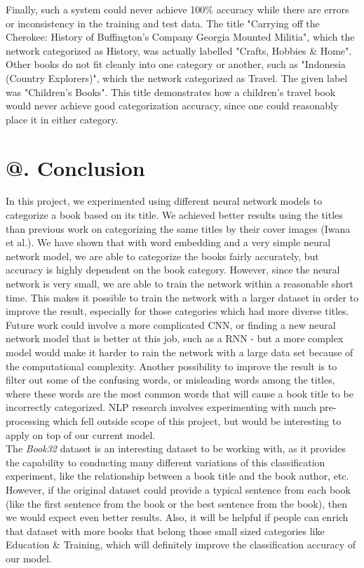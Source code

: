 \documentclass[jou,apacite, 10px]{apa6}
\makeatletter
\newcommand*{\rom}[1]{\expandafter\@slowromancap\romannumeral #1@}
\makeatother
\begin{document}
Finally, such a system could never achieve 100\% accuracy while there are errors or inconsistency in the training and test data. The title "Carrying off the Cherokee: History of Buffington's Company Georgia Mounted Militia", which the network categorized as History, was actually labelled "Crafts, Hobbies \& Home". Other books do not fit cleanly into one category or another, such as "Indonesia (Country Explorers)", which the network categorized as Travel. The given label was "Children's Books". This title demonstrates how a children's travel book would never achieve good categorization accuracy, since one could reasonably place it in either category.

\section{\rom{6}. Conclusion}
In this project, we experimented using different neural network models to categorize a book based on its title. We achieved better results using the titles than previous work on categorizing the same titles by their cover images (Iwana et al.). We have shown that with word embedding and a very simple neural network model, we are able to categorize the books fairly accurately, but accuracy is highly dependent on the book category. However, since the neural network is very small, we are able to train the network within a reasonable short time. This makes it possible to train the network with a larger dataset in order to improve the result, especially for those categories which had more diverse titles. Future work could involve a more complicated CNN, or finding a new neural network model that is better at this job, such as a RNN - but a more complex model would make it harder to rain the network with a large data set because of the computational complexity. Another possibility to improve the result is to filter out some of the confusing words, or misleading words among the titles, where these words are the most common words that will cause a book title to be incorrectly categorized. NLP research involves experimenting with much pre-processing which fell outside scope of this project, but would be interesting to apply on top of our current model.\\

 The \textit{Book32} dataset is an interesting dataset to be working with, as it provides the capability to conducting many different variations of this classification experiment, like the relationship between a book title and the book author, etc. However, if the original dataset could provide a typical sentence from each book (like the first sentence from the book or the best sentence from the book), then we would expect even better results. Also, it will be helpful if people can enrich that dataset with more books that belong those small sized categories like Education \& Training, which will definitely improve the classification accuracy of our model.\\
\end{document}
